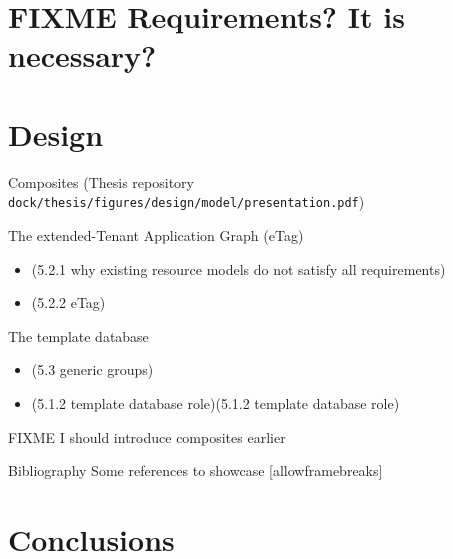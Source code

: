 \section{FIXME Requirements? It is necessary?}

\section{Design}
\begin{frame}{Composites}
  (Thesis repository \texttt{dock/thesis/figures/design/model/presentation.pdf})
\end{frame}
\begin{frame}{The extended-Tenant Application Graph (eTag)}
  \begin{itemize}
    \item (5.2.1 why existing resource models do not satisfy all requirements)
    \item (5.2.2 eTag)
  \end{itemize}
\end{frame}
\begin{frame}{The template database}
  \begin{itemize}
    \item (5.3 generic groups)
    \item (5.1.2 template database role)(5.1.2 template database role)
  \end{itemize}
\end{frame}
\begin{frame}{FIXME I should introduce composites earlier}
\end{frame}

\begin{frame}{Bibliography}
  Some references to showcase [allowframebreaks] \cite{netchain, incbricks, daiet, sharp}
\end{frame}

\section{Conclusions}





